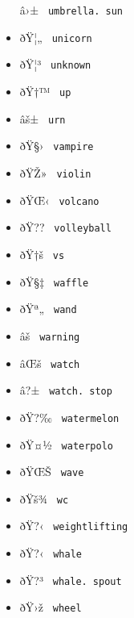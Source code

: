 \begin{itemize}
  \label{symbol-umbrella.sun}{{ â›± }
  \texttt{\ umbrella.\ sun\ }}
\item
  \label{symbol-unicorn}{{ ðŸ¦„ } \texttt{\ unicorn\ }}
\item
  \label{symbol-unknown}{{ ðŸ¦³ } \texttt{\ unknown\ }}
\item
  \label{symbol-up}{{ ðŸ†™ } \texttt{\ up\ }}
\item
  \label{symbol-urn}{{ âš± } \texttt{\ urn\ }}
\item
  \label{symbol-vampire}{{ ðŸ§› } \texttt{\ vampire\ }}
\item
  \label{symbol-violin}{{ ðŸŽ» } \texttt{\ violin\ }}
\item
  \label{symbol-volcano}{{ ðŸŒ‹ } \texttt{\ volcano\ }}
\item
  \label{symbol-volleyball}{{ ðŸ?? }
  \texttt{\ volleyball\ }}
\item
  \label{symbol-vs}{{ ðŸ†š } \texttt{\ vs\ }}
\item
  \label{symbol-waffle}{{ ðŸ§‡ } \texttt{\ waffle\ }}
\item
  \label{symbol-wand}{{ ðŸª„ } \texttt{\ wand\ }}
\item
  \label{symbol-warning}{{ âš } \texttt{\ warning\ }}
\item
  \label{symbol-watch}{{ âŒš } \texttt{\ watch\ }}
\item
  \label{symbol-watch.stop}{{ â?± }
  \texttt{\ watch.\ stop\ }}
\item
  \label{symbol-watermelon}{{ ðŸ?‰ }
  \texttt{\ watermelon\ }}
\item
  \label{symbol-waterpolo}{{ ðŸ¤½ }
  \texttt{\ waterpolo\ }}
\item
  \label{symbol-wave}{{ ðŸŒŠ } \texttt{\ wave\ }}
\item
  \label{symbol-wc}{{ ðŸš¾ } \texttt{\ wc\ }}
\item
  \label{symbol-weightlifting}{{ ðŸ?‹ }
  \texttt{\ weightlifting\ }}
\item
  \label{symbol-whale}{{ ðŸ?‹ } \texttt{\ whale\ }}
\item
  \label{symbol-whale.spout}{{ ðŸ?³ }
  \texttt{\ whale.\ spout\ }}
\item
  \label{symbol-wheel}{{ ðŸ›ž } \texttt{\ wheel\ }}

\end{itemize}
